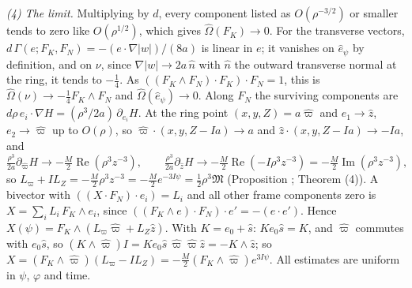 \emph{(4) The limit.} Multiplying by $d$, every component listed as $O(\rho^{-3/2})$ or smaller tends to zero like $O(\rho^{1/2})$, which gives $\widehat\Omega(F_K) \to 0$. For the transverse vectors, $d\,\Gamma(e; F_K, F_N) = -(e \cdot \nabla|w|)/(8a)$ is linear in $e$; it vanishes on $\hat e_\psi$ by definition, and on $\nu$, since $\nabla|w| \to 2a\,\hat n$ with $\hat n$ the outward transverse normal at the ring, it tends to $-\tfrac14$. As $((F_K \wedge F_N) \cdot F_K) \cdot F_N = 1$, this is $\widehat\Omega(\nu) \to -\tfrac14 F_K \wedge F_N$ and $\widehat\Omega(\hat e_\psi) \to 0$. Along $F_N$ the surviving components are $d\rho\,e_i \cdot \nabla H = (\rho^3/2a)\,\partial_{e_i}H$. At the ring point $(x, y, Z) = a\hat\varpi$ and $e_1 \to \hat z$, $e_2 \to \hat\varpi$ up to $O(\rho)$, so $\hat\varpi \cdot (x, y, Z - Ia) \to a$ and $\hat z \cdot (x, y, Z - Ia) \to -Ia$, and
\[
\tfrac{\rho^3}{2a}\partial_{\hat\varpi}H \to -\tfrac{M}{2}\operatorname{Re}(\rho^3z^{-3}), \qquad \tfrac{\rho^3}{2a}\partial_{\hat z}H \to -\tfrac{M}{2}\operatorname{Re}(-I\rho^3z^{-3}) = -\tfrac{M}{2}\operatorname{Im}(\rho^3z^{-3}),
\]
so $L_\varpi + IL_Z = -\tfrac{M}{2}\rho^3z^{-3} = -\tfrac{M}{2}e^{-3I\psi} = \tfrac12\rho^3\mathfrak M$ (Proposition ; Theorem (4)). A bivector with $((X \cdot F_N) \cdot e_i) = L_i$ and all other frame components zero is $X = \sum_i L_i\,F_K \wedge e_i$, since $((F_K \wedge e) \cdot F_N) \cdot e' = -(e \cdot e')$. Hence $X(\psi) = F_K \wedge (L_\varpi\hat\varpi + L_Z\hat z)$. With $K = e_0 + \hat s$: $K e_0\hat s = K$, and $\hat\varpi$ commutes with $e_0\hat s$, so $(K \wedge \hat\varpi)I = K e_0 \hat s\,\hat\varpi\hat\varpi\hat z = -K \wedge \hat z$; so $X = (F_K \wedge \hat\varpi)(L_\varpi - IL_Z) = -\tfrac{M}{2}(F_K \wedge \hat\varpi)e^{3I\psi}$. All estimates are uniform in $\psi$, $\varphi$ and time.


